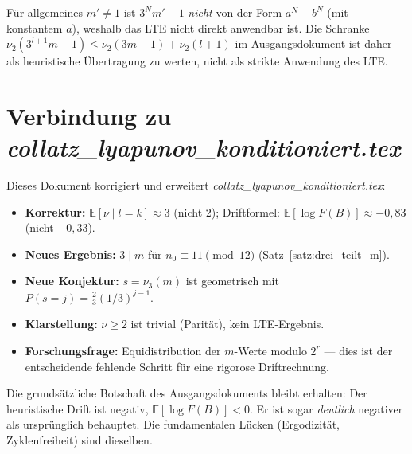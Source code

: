 \documentclass[12pt,a4paper]{article}
\newcommand{\vii}{\nu_2}
\newcommand{\viii}{\nu_3}
\newcommand{\E}{\mathbb{E}}
\newcommand{\logF}{\log F(B)}
\begin{document}
\medskip
Für allgemeines $m' \neq 1$ ist $3^N m' - 1$ \emph{nicht} von der Form $a^N - b^N$
(mit konstantem $a$), weshalb das LTE nicht direkt anwendbar ist.
Die Schranke $\vii(3^{l+1} m - 1) \leq \vii(3m-1) + \vii(l+1)$ im Ausgangsdokument
ist daher als heuristische Übertragung zu werten, nicht als strikte Anwendung des LTE.

\section{Verbindung zu \textit{collatz\_lyapunov\_konditioniert.tex}}
\label{app:verbindung}

Dieses Dokument korrigiert und erweitert
\textit{collatz\_lyapunov\_konditioniert.tex}:

\begin{itemize}[noitemsep]
  \item \textbf{Korrektur:} $\E[\nu \mid l{=}k] \approx 3$ (nicht $2$);
        Driftformel: $\E[\logF] \approx -0{,}83$ (nicht $-0{,}33$).
  \item \textbf{Neues Ergebnis:} $3 \mid m$ für $n_0 \equiv 11 \pmod{12}$
        (Satz~\ref{satz:drei_teilt_m}).
  \item \textbf{Neue Konjektur:} $s = \viii(m)$ ist geometrisch mit
        $P(s{=}j) = \frac{2}{3}(1/3)^{j-1}$.
  \item \textbf{Klarstellung:} $\nu \geq 2$ ist trivial (Parität),
        kein LTE-Ergebnis.
  \item \textbf{Forschungsfrage:} Equidistribution der $m$-Werte modulo
        $2^r$ --- dies ist der entscheidende fehlende Schritt für eine
        rigorose Driftrechnung.
\end{itemize}

Die grundsätzliche Botschaft des Ausgangsdokuments bleibt erhalten:
Der heuristische Drift ist negativ, $\E[\logF] < 0$.
Er ist sogar \emph{deutlich} negativer als ursprünglich behauptet.
Die fundamentalen Lücken (Ergodizität, Zyklenfreiheit) sind dieselben.
\end{document}
